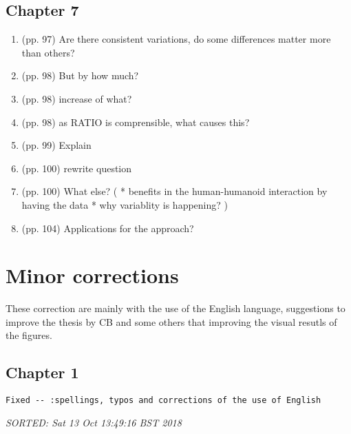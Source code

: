 \documentclass[10pt]{article}
\begin{document}
\subsection{Chapter 7}

\begin{enumerate}

\item (pp. 97) Are there consistent variations, do some differences
	matter more than others?

\item (pp. 98) But by how much?

\item (pp. 98) increase of what?

\item (pp. 98) as RATIO is comprensible, what causes this?

\item (pp. 99) Explain

\item (pp. 100) rewrite question

\item (pp. 100) What else?
	(
	* benefits in the human-humanoid interaction 
	by having the data
	* why variablity is happening?
	)	

\item (pp. 104) Applications for the approach?



\end{enumerate}







\section{Minor corrections}
These correction are mainly with the use of the English language, 
suggestions to improve the thesis by CB and some others that improving 
the visual resutls of the figures.


\subsection*{Chapter 1}

\begin{verbatim}
Fixed -- :spellings, typos and corrections of the use of English
\end{verbatim}
\textit{
SORTED: 
Sat 13 Oct 13:49:16 BST 2018
}
\\
\end{document}
